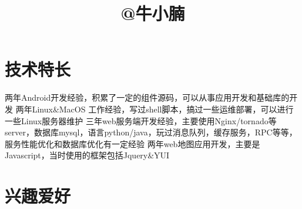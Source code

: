 \documentclass[12pt,a4paper]{moderncv}
\title{@牛小腩}               %
\begin{document}
\maketitle


\section{技术特长}
\cvitem{}
{两年Android开发经验，积累了一定的组件源码，可以从事应用开发和基础库的开发}{}
\cvitem{}
{两年Linux\&MacOS 工作经验，写过shell脚本，搞过一些运维部署，可以进行一些Linux服务器维护}
\cvitem{}
{三年web服务端开发经验，主要使用Nginx/tornado等server，数据库mysql，语言python/java，玩过消息队列，缓存服务，RPC等等，服务性能优化和数据库优化有一定经验}
\cvitem{}
{两年web地图应用开发，主要是Javascript，当时使用的框架包括Jquery\&YUI}

\section{兴趣爱好}

\renewcommand{\baselinestretch}{1.0}

\closesection{}                   %
\renewcommand{\listitemsymbol}{-} %
\end{document}
